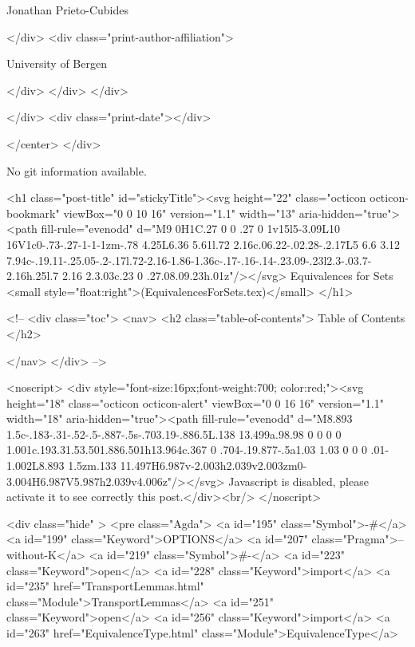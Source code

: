                   Jonathan Prieto-Cubides
                
              </div>
              <div class="print-author-affiliation">
                
                  University of Bergen
                
                </div>
            </div>
          </div>
          
          
        </div>
        <div class="print-date"></div>
        
        
    </center>
  </div>

  
  No git information available.
  

  <h1 class="post-title" id="stickyTitle"><svg height="22" class="octicon octicon-bookmark" viewBox="0 0 10 16" version="1.1" width="13" aria-hidden="true"><path fill-rule="evenodd" d="M9 0H1C.27 0 0 .27 0 1v15l5-3.09L10 16V1c0-.73-.27-1-1-1zm-.78 4.25L6.36 5.61l.72 2.16c.06.22-.02.28-.2.17L5 6.6 3.12 7.94c-.19.11-.25.05-.2-.17l.72-2.16-1.86-1.36c-.17-.16-.14-.23.09-.23l2.3-.03.7-2.16h.25l.7 2.16 2.3.03c.23 0 .27.08.09.23h.01z"/></svg> Equivalences for Sets <small style="float:right">(EquivalencesForSets.tex)</small>
  </h1>

  <!-- 
  <div class="toc">
    <nav>
    <h2 class="table-of-contents"> Table of Contents </h2>
      

    </nav>
  </div>
   -->

  <noscript>
  <div style="font-size:16px;font-weight:700; color:red;"><svg height="18" class="octicon octicon-alert" viewBox="0 0 16 16" version="1.1" width="18" aria-hidden="true"><path fill-rule="evenodd" d="M8.893 1.5c-.183-.31-.52-.5-.887-.5s-.703.19-.886.5L.138 13.499a.98.98 0 0 0 0 1.001c.193.31.53.501.886.501h13.964c.367 0 .704-.19.877-.5a1.03 1.03 0 0 0 .01-1.002L8.893 1.5zm.133 11.497H6.987v-2.003h2.039v2.003zm0-3.004H6.987V5.987h2.039v4.006z"/></svg> Javascript is disabled, please activate it to see correctly this post.</div><br/>
  </noscript>

  <div class="hide" >
<pre class="Agda">
<a id="195" class="Symbol">{-#</a> <a id="199" class="Keyword">OPTIONS</a> <a id="207" class="Pragma">--without-K</a> <a id="219" class="Symbol">#-}</a>
<a id="223" class="Keyword">open</a> <a id="228" class="Keyword">import</a> <a id="235" href="TransportLemmas.html" class="Module">TransportLemmas</a>
<a id="251" class="Keyword">open</a> <a id="256" class="Keyword">import</a> <a id="263" href="EquivalenceType.html" class="Module">EquivalenceType</a>

